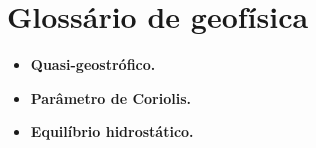 
\chapter{Glossário de geofísica}\label{cap:apendice_01_glossario}

\begin{itemize}
    \item \textbf{Quasi-geostrófico.}
    \item \textbf{Parâmetro de Coriolis.}
    \item \textbf{Equilíbrio hidrostático.}
\end{itemize}
